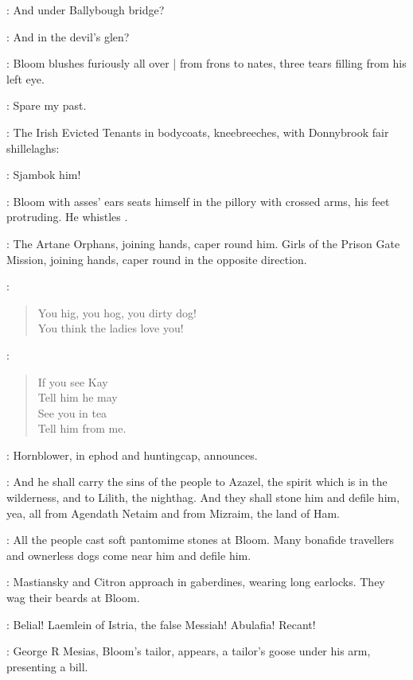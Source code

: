 \FemaleInfant:
And under Ballybough bridge?

\Hollybush:
And in the devil's glen?

:
Bloom blushes furiously all over |
from frons to nates,
three tears filling from his left eye.

\Bloom:
Spare my past.

:
The Irish Evicted Tenants in bodycoats,
kneebreeches,
with Donnybrook fair shillelaghs:

\EvictedTenants:
Sjambok him!

:
Bloom with asses' ears seats himself in the pillory with crossed arms,
his feet protruding.
He whistles .

:
The Artane Orphans,
joining hands,
caper round him.
Girls of the Prison Gate Mission,
joining hands,
caper round in the opposite direction.

\ArtaneOrphans:
\begin{verse}
%
    You hig, you hog, you dirty dog!\\
    You think the ladies love you!
\end{verse}

\PrisonGateGirls[1]:
\begin{verse}
    If you see Kay\\
    Tell him he may\\
    See you in tea\\
    Tell him from me.
\end{verse}

:
Hornblower,
in ephod and huntingcap,
announces.

\Hornblower:
And he shall carry the sins of the people to Azazel,
the spirit which is in the wilderness,
and to Lilith,
the nighthag.
And they shall stone him and defile him,
yea,
all from Agendath Netaim and from Mizraim,
the land of Ham.

:
All the people cast soft pantomime stones at Bloom.
Many bonafide travellers and ownerless dogs come near him and defile him.

:
Mastiansky and Citron approach in gaberdines,
wearing long earlocks.
They wag their beards at Bloom.

\MastianskyCitron:
Belial!
Laemlein of Istria,
the false Messiah!
Abulafia!
Recant!

:
George R Mesias,
Bloom's tailor,
appears,
a tailor's goose under his arm,
presenting a bill.

